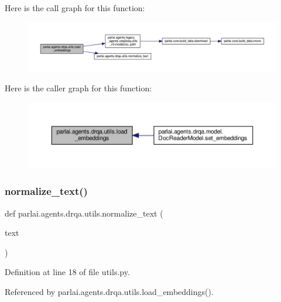 Here is the call graph for this function\+:
\nopagebreak
\begin{figure}[H]
\begin{center}
\leavevmode
\includegraphics[width=350pt]{namespaceparlai_1_1agents_1_1drqa_1_1utils_aa92d9906125210574825a20c75c199c8_cgraph}
\end{center}
\end{figure}
Here is the caller graph for this function\+:
\nopagebreak
\begin{figure}[H]
\begin{center}
\leavevmode
\includegraphics[width=350pt]{namespaceparlai_1_1agents_1_1drqa_1_1utils_aa92d9906125210574825a20c75c199c8_icgraph}
\end{center}
\end{figure}
\mbox{\label{namespaceparlai_1_1agents_1_1drqa_1_1utils_a125ab4e64306060e9ecaa3999f7be6b6}} 
\subsubsection{\texorpdfstring{normalize\+\_\+text()}{normalize\_text()}}
{\footnotesize\ttfamily def parlai.\+agents.\+drqa.\+utils.\+normalize\+\_\+text (\begin{DoxyParamCaption}\item[{}]{text }\end{DoxyParamCaption})}



Definition at line 18 of file utils.\+py.



Referenced by parlai.\+agents.\+drqa.\+utils.\+load\+\_\+embeddings().

